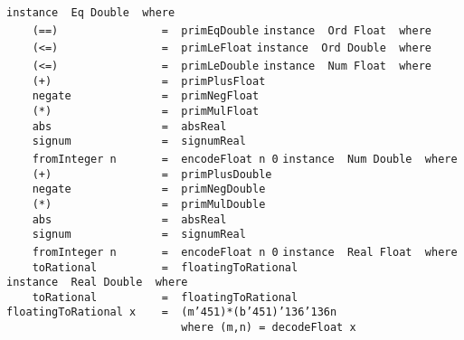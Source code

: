 \eprogB\noindent\bprogB
\mbox{\tt instance\ \ Eq\ Double\ \ where}\\
\mbox{\tt \ \ \ \ (==)\ \ \ \ \ \ \ \ \ \ \ \ \ \ \ \ =\ \ primEqDouble}
\eprogB\noindent\bprogB
\mbox{\tt instance\ \ Ord\ Float\ \ where}\\
\mbox{\tt \ \ \ \ (<=)\ \ \ \ \ \ \ \ \ \ \ \ \ \ \ \ =\ \ primLeFloat}
\eprogB\noindent\bprogB
\mbox{\tt instance\ \ Ord\ Double\ \ where}\\
\mbox{\tt \ \ \ \ (<=)\ \ \ \ \ \ \ \ \ \ \ \ \ \ \ \ =\ \ primLeDouble}
\eprogB\noindent\bprogB
\mbox{\tt instance\ \ Num\ Float\ \ where}\\
\mbox{\tt \ \ \ \ (+)\ \ \ \ \ \ \ \ \ \ \ \ \ \ \ \ \ =\ \ primPlusFloat}\\
\mbox{\tt \ \ \ \ negate\ \ \ \ \ \ \ \ \ \ \ \ \ \ =\ \ primNegFloat}\\
\mbox{\tt \ \ \ \ (*)\ \ \ \ \ \ \ \ \ \ \ \ \ \ \ \ \ =\ \ primMulFloat}\\
\mbox{\tt \ \ \ \ abs\ \ \ \ \ \ \ \ \ \ \ \ \ \ \ \ \ =\ \ absReal}\\
\mbox{\tt \ \ \ \ signum\ \ \ \ \ \ \ \ \ \ \ \ \ \ =\ \ signumReal}\\
\mbox{\tt \ \ \ \ fromInteger\ n\ \ \ \ \ \ \ =\ \ encodeFloat\ n\ 0}
\eprogB\noindent\bprogB
\mbox{\tt instance\ \ Num\ Double\ \ where}\\
\mbox{\tt \ \ \ \ (+)\ \ \ \ \ \ \ \ \ \ \ \ \ \ \ \ \ =\ \ primPlusDouble}\\
\mbox{\tt \ \ \ \ negate\ \ \ \ \ \ \ \ \ \ \ \ \ \ =\ \ primNegDouble}\\
\mbox{\tt \ \ \ \ (*)\ \ \ \ \ \ \ \ \ \ \ \ \ \ \ \ \ =\ \ primMulDouble}\\
\mbox{\tt \ \ \ \ abs\ \ \ \ \ \ \ \ \ \ \ \ \ \ \ \ \ =\ \ absReal}\\
\mbox{\tt \ \ \ \ signum\ \ \ \ \ \ \ \ \ \ \ \ \ \ =\ \ signumReal}\\
\mbox{\tt \ \ \ \ fromInteger\ n\ \ \ \ \ \ \ =\ \ encodeFloat\ n\ 0}
\eprogB\noindent\bprogB
\mbox{\tt instance\ \ Real\ Float\ \ where}\\
\mbox{\tt \ \ \ \ toRational\ \ \ \ \ \ \ \ \ \ =\ \ floatingToRational}
\eprogB\noindent\bprogB
\mbox{\tt instance\ \ Real\ Double\ \ where}\\
\mbox{\tt \ \ \ \ toRational\ \ \ \ \ \ \ \ \ \ =\ \ floatingToRational}
\eprogB\noindent\bprogB
\mbox{\tt floatingToRational\ x\ \ \ \ =\ \ (m{\char'45}1)*(b{\char'45}1){\char'136}{\char'136}n}\\
\mbox{\tt \ \ \ \ \ \ \ \ \ \ \ \ \ \ \ \ \ \ \ \ \ \ \ \ \ \ \ where\ (m,n)\ =\ decodeFloat\ x}\\
